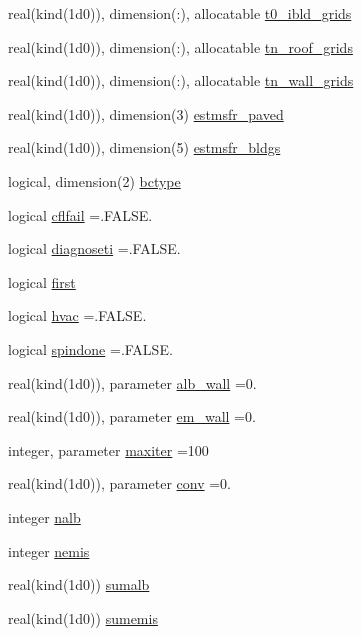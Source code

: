 \begin{DoxyCompactItemize}
\item 
real(kind(1d0)), dimension(\+:), allocatable \hyperlink{namespaceestm__data_a746501ddba4d45a49ef9a65f7e668cd8}{t0\+\_\+ibld\+\_\+grids}
\item 
real(kind(1d0)), dimension(\+:), allocatable \hyperlink{namespaceestm__data_acf62443d4b1f09aedd9a2a08c8a1d3b1}{tn\+\_\+roof\+\_\+grids}
\item 
real(kind(1d0)), dimension(\+:), allocatable \hyperlink{namespaceestm__data_a5aa42393956ede1855e258e1943f27a2}{tn\+\_\+wall\+\_\+grids}
\item 
real(kind(1d0)), dimension(3) \hyperlink{namespaceestm__data_ae476f025b928a0aa7b7a57df9f0b253f}{estmsfr\+\_\+paved}
\item 
real(kind(1d0)), dimension(5) \hyperlink{namespaceestm__data_a8b2fa2867ca58a77b5dc128d74407658}{estmsfr\+\_\+bldgs}
\item 
logical, dimension(2) \hyperlink{namespaceestm__data_afa9b834a7e0defc816bb595ace6791f4}{bctype}
\item 
logical \hyperlink{namespaceestm__data_ac47c8fc3c7284a3308fe6b69ee8a5cc5}{cflfail} =.F\+A\+L\+S\+E.
\item 
logical \hyperlink{namespaceestm__data_a38be752511b3e4dcbb87c6152885d83b}{diagnoseti} =.F\+A\+L\+S\+E.
\item 
logical \hyperlink{namespaceestm__data_a24d84ca68dce8c57c22e0d7861609274}{first}
\item 
logical \hyperlink{namespaceestm__data_a6280dc53c8da5314be8c10ef13ead25e}{hvac} =.F\+A\+L\+S\+E.
\item 
logical \hyperlink{namespaceestm__data_af824dcc2de6123a45bb4267b0c55c56c}{spindone} =.F\+A\+L\+S\+E.
\item 
real(kind(1d0)), parameter \hyperlink{namespaceestm__data_acdf885f5459c2301613674450cb0d4df}{alb\+\_\+wall} =0.
\item 
real(kind(1d0)), parameter \hyperlink{namespaceestm__data_afe2e8c1c729a44384912e9085576bc4b}{em\+\_\+wall} =0.
\item 
integer, parameter \hyperlink{namespaceestm__data_af2f45374dbd86a6f4a2a89914e3b17b1}{maxiter} =100
\item 
real(kind(1d0)), parameter \hyperlink{namespaceestm__data_adfd1d5673f5f4f967581cab77b4bc1ad}{conv} =0.
\item 
integer \hyperlink{namespaceestm__data_af0ef7f03ce2a913a43a1b3dcccc478f9}{nalb}
\item 
integer \hyperlink{namespaceestm__data_a781ad000e3af86859a4cba9329017189}{nemis}
\item 
real(kind(1d0)) \hyperlink{namespaceestm__data_af4bbbc09fb07fc02a62aa10ef9b0fc50}{sumalb}
\item 
real(kind(1d0)) \hyperlink{namespaceestm__data_ab6cbc4b326b1f0403459db52b8cf12dc}{sumemis}
\end{DoxyCompactItemize}


